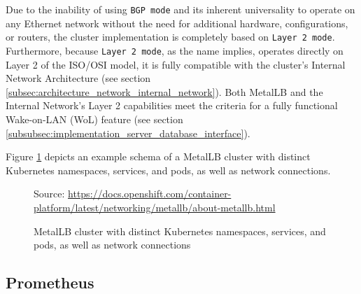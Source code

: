 Due to the inability of using \texttt{BGP mode} and its inherent universality to
operate on any Ethernet network without the need for additional hardware,
configurations, or routers, the cluster implementation is completely based on
\texttt{Layer 2 mode}. Furthermore, because \texttt{Layer 2 mode}, as the name implies,
operates directly on Layer 2 of the ISO/OSI model, it is fully compatible with the
cluster's Internal Network Architecture (see section
\ref{subsec:architecture_network_internal_network}). Both MetalLB and the
Internal Network's Layer 2 capabilities meet the criteria for a fully functional
Wake-on-LAN (WoL) feature (see section \ref{subsubsec:implementation_server_database_interface}).

Figure \ref{fig:metallb} depicts an example schema of a MetalLB cluster with
distinct Kubernetes namespaces, services, and pods, as well as network connections.

\clearpage


\begin{figure}[htbp]
  \centering
  \def\stackalignment{r} %
  {\scriptsize Source: \url{https://docs.openshift.com/container-platform/latest/networking/metallb/about-metallb.html} }
  \caption{MetalLB
  cluster
  with
  distinct
  Kubernetes
  namespaces,
  services,
  and
  pods,
  as
  well
  as
  network
  connections}
  \label{fig:metallb}
\end{figure}

\subsection{Prometheus}
\label{subsec:implementation_dependencies_prometheus}

